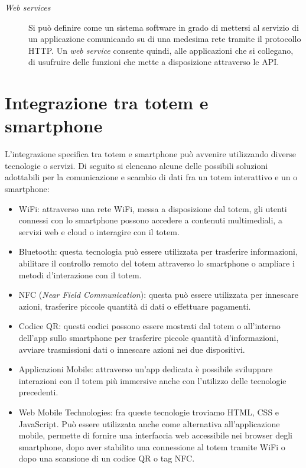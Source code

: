 \begin{description}
    \item [\textit{Web services}] Si può definire come un sistema software in grado di mettersi al servizio di un applicazione comunicando su di una medesima rete tramite il protocollo HTTP. Un \textit{web service} consente quindi, alle applicazioni che si collegano, di usufruire delle funzioni che mette a disposizione attraverso le API.
\end{description}

\section{Integrazione tra totem e smartphone}
L'integrazione specifica tra totem e smartphone può avvenire utilizzando diverse tecnologie o servizi. Di seguito si elencano alcune delle possibili soluzioni adottabili per la comunicazione e scambio di dati fra un totem interattivo e un o smartphone:

\begin{itemize}
    \item WiFi: attraverso una rete WiFi, messa a disposizione dal totem, gli utenti connessi con lo smartphone possono accedere a contenuti multimediali, a servizi web e cloud o interagire con il totem.
    \item Bluetooth: questa tecnologia può essere utilizzata per trasferire informazioni, abilitare il controllo remoto del totem attraverso lo smartphone o ampliare i metodi d'interazione con il totem.
    \item NFC (\textit{Near Field Communication}): questa può essere utilizzata per innescare azioni, trasferire piccole quantità di dati o effettuare pagamenti.
    \item Codice QR: questi codici possono essere mostrati dal totem o all'interno dell'app sullo smartphone per trasferire piccole quantità d'informazioni, avviare trasmissioni dati o innescare azioni nei due dispositivi.
    \item Applicazioni Mobile: attraverso un'app dedicata è possibile sviluppare interazioni con il totem più immersive anche con l'utilizzo delle tecnologie precedenti.
    \item Web Mobile Technologies: fra queste tecnologie troviamo HTML, CSS e JavaScript. Può essere utilizzata anche come alternativa all'applicazione mobile, permette di fornire una interfaccia web accessibile nei browser degli smartphone, dopo aver stabilito una connessione al totem tramite WiFi o dopo una scansione di un codice QR o tag NFC.
\end{itemize}